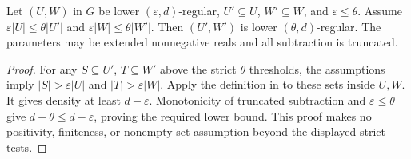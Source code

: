 \begin{lemma}
Let $(U,W)$ in $G$ be lower $(\varepsilon,d)$-regular,
$U'\subseteq U$, $W'\subseteq W$, and $\varepsilon\leq\theta$.
Assume $\varepsilon|U|\leq\theta|U'|$ and
$\varepsilon|W|\leq\theta|W'|$. Then $(U',W')$ is lower
$(\theta,d)$-regular. The parameters may be extended nonnegative
reals and all subtraction is truncated.
\end{lemma}
\begin{proof}
For any $S\subseteq U'$, $T\subseteq W'$ above the strict
$\theta$ thresholds, the assumptions imply
$|S|>\varepsilon|U|$ and $|T|>\varepsilon|W|$.
Apply the definition in  to these sets
inside $U,W$. It gives density at least $d-\varepsilon$.
Monotonicity of truncated subtraction and $\varepsilon\leq\theta$
give $d-\theta\leq d-\varepsilon$, proving the required lower bound.
This proof makes no positivity, finiteness, or nonempty-set assumption
beyond the displayed strict tests.
\end{proof}
